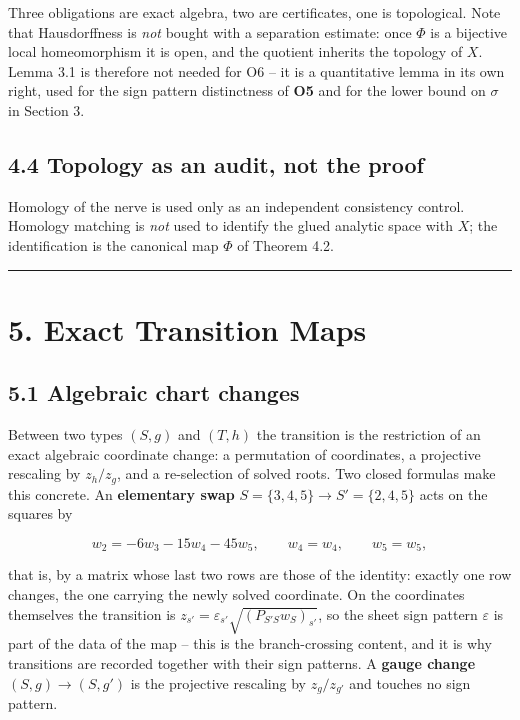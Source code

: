 Three obligations are exact algebra, two are certificates, one is topological. Note that Hausdorffness is \emph{not} bought with a separation estimate: once \(\Phi\) is a bijective local homeomorphism it is open, and the quotient inherits the topology of \(X\). Lemma 3.1 is therefore not needed for O6 -- it is a quantitative lemma in its own right, used for the sign pattern distinctness of \textbf{O5} and for the lower bound on \(\sigma\) in Section 3.

\subsection{4.4 Topology as an audit, not the proof}\label{topology-as-an-audit-not-the-proof}

Homology of the nerve is used only as an independent consistency control. Homology matching is \emph{not} used to identify the glued analytic space with \(X\); the identification is the canonical map \(\Phi\) of Theorem 4.2.

\begin{center}\rule{\linewidth}{0.5pt}\end{center}

\section{5. Exact Transition Maps}\label{exact-transition-maps}

\subsection{5.1 Algebraic chart changes}\label{algebraic-chart-changes}

Between two types \((S, g)\) and \((T, h)\) the transition is the restriction of an exact algebraic coordinate change: a permutation of coordinates, a projective rescaling by \(z_h/z_g\), and a re-selection of solved roots. Two closed formulas make this concrete. An \textbf{elementary swap} \(S = \{3,4,5\} \to S' = \{2,4,5\}\) acts on the squares by

\[w_2 = -6 w_3 - 15 w_4 - 45 w_5, \qquad w_4 = w_4, \qquad w_5 = w_5,\]

that is, by a matrix whose last two rows are those of the identity: exactly one row changes, the one carrying the newly solved coordinate. On the coordinates themselves the transition is \(z_{s'} = \varepsilon_{s'} \sqrt{(P_{S'S} w_S)_{s'}}\), so the sheet sign pattern \(\varepsilon\) is part of the data of the map -- this is the branch-crossing content, and it is why transitions are recorded together with their sign patterns. A \textbf{gauge change} \((S, g) \to (S, g')\) is the projective rescaling by \(z_g / z_{g'}\) and touches no sign pattern.

